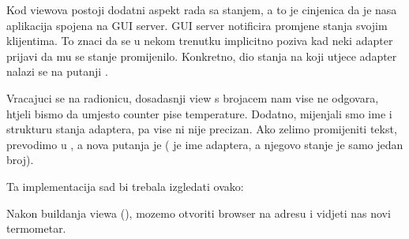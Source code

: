 \documentclass[letterpaper,10pt,croatian]{sphinxmanual}
\begin{document}
\begin{sphinxVerbatim}[commandchars=\\\{\}]
               
\end{sphinxVerbatim}

\sphinxAtStartPar
Kod viewova postoji dodatni aspekt rada sa stanjem, a to je cinjenica da je
nasa aplikacija spojena na GUI server. GUI server notificira promjene stanja
svojim klijentima. To znaci da se u nekom trenutku implicitno poziva 
kad neki adapter prijavi da mu se stanje promijenilo. Konkretno, dio stanja na
koji utjece adapter nalazi se na putanji .

\sphinxAtStartPar
Vracajuci se na radionicu, dosadasnji view s brojacem nam vise ne odgovara,
htjeli bismo da umjesto counter pise temperature. Dodatno, mijenjali smo ime i
strukturu stanja adaptera, pa vise ni  nije precizan. Ako zelimo
promijeniti tekst, prevodimo  u , a nova putanja je
 ( je ime adaptera, a njegovo stanje je
samo jedan broj).

\sphinxAtStartPar
Ta implementacija sad bi trebala izgledati ovako:

\begin{sphinxVerbatim}[commandchars=\\\{\}]
 


   
     \PYG{p}{[}  \PYG{p}{]}
\end{sphinxVerbatim}

\sphinxAtStartPar
Nakon buildanja viewa (), mozemo otvoriti browser na adresu
 i vidjeti nas novi termometar.



\renewcommand{\indexname}{Abecedni popis}
\printindex
\end{document}
